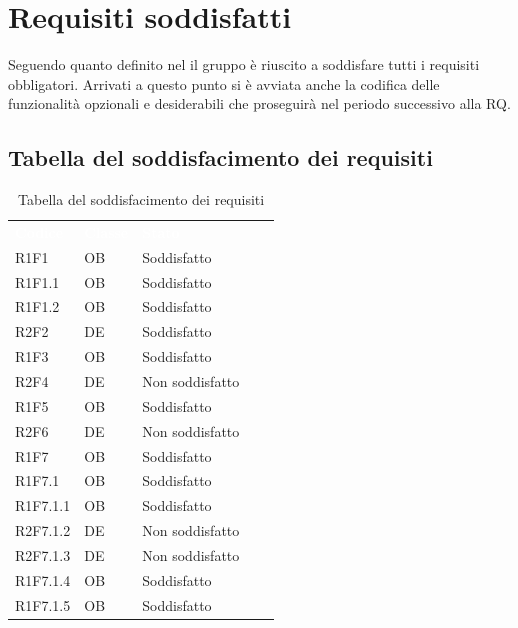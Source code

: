 \section{Requisiti soddisfatti}
Seguendo quanto definito nel  il gruppo è riuscito a soddisfare tutti i requisiti obbligatori. Arrivati a questo punto si è avviata anche la codifica delle funzionalità opzionali e desiderabili che proseguirà nel periodo successivo alla RQ. 
\subsection{Tabella del soddisfacimento dei requisiti}
\renewcommand{\arraystretch}{1.5}	 
{
\setlength\arrayrulewidth{1pt}
\begin{longtable}{C{2.5cm} C{2cm} C{3.5cm}}
		\textcolor{white}{\textbf{Codice}} &
		\textcolor{white}{\textbf{Classe}} &
		\textcolor{white}{\textbf{Stato}} 
		\endfirsthead
	    		\\
	    \endfoot
	    \caption{Tabella del soddisfacimento dei requisiti}
	    \endlastfoot

R1F1 & OB & Soddisfatto\\
R1F1.1 & OB & Soddisfatto\\
R1F1.2 & OB & Soddisfatto\\

R2F2 & DE & Soddisfatto\\

R1F3 & OB & Soddisfatto\\

R2F4 & DE & Non soddisfatto\\
R1F5 & OB & Soddisfatto\\
R2F6 & DE & Non soddisfatto\\
R1F7 & OB & Soddisfatto\\
R1F7.1 & OB & Soddisfatto\\
R1F7.1.1 & OB & Soddisfatto\\
R2F7.1.2 & DE & Non soddisfatto\\
R2F7.1.3 & DE & Non soddisfatto\\

R1F7.1.4 & OB & Soddisfatto\\

R1F7.1.5 & OB & Soddisfatto\\


\end{longtable}}
